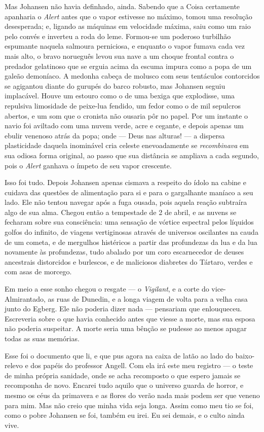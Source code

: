 Mas Johansen não havia definhado, ainda. Sabendo que a Coisa certamente
apanharia o \emph{Alert} antes que o vapor estivesse no máximo, tomou
uma resolução desesperada; e, ligando as máquinas em velocidade máxima,
saiu como um raio pelo convés e inverteu a roda do leme. Formou-se um
poderoso turbilhão espumante naquela salmoura perniciosa, e enquanto o
vapor fumava cada vez mais alto, o bravo norueguês levou sua nave a um
choque frontal contra o predador gelatinoso que se erguia acima da
escuma impura como a popa de um galeão demoníaco. A medonha cabeça de
molusco com seus tentáculos contorcidos se agigantou diante do gurupés
do barco robusto, mas Johansen seguiu implacável. Houve um estouro como
o de uma bexiga que explodisse, uma repulsiva limosidade de peixe-lua
fendido, um fedor como o de mil sepulcros abertos, e um som que o
cronista não ousaria pôr no papel. Por um instante o navio foi aviltado
com uma nuvem verde, acre e cegante, e depois apenas um ebulir venenoso
atrás da popa; onde --- Deus nas alturas! --- a dispersa plasticidade
daquela inominável cria celeste enevoadamente se \emph{recombinava} em
sua odiosa forma original, ao passo que sua distância se ampliava a cada
segundo, pois o \emph{Alert} ganhava o ímpeto de seu vapor crescente.

Isso foi tudo. Depois Johansen apenas cismava a respeito do ídolo na
cabine e cuidava das questões de alimentação para si e para o
gargalhante maníaco a seu lado. Ele não tentou navegar após a fuga
ousada, pois aquela reação subtraíra algo de sua alma. Chegou então a
tempestade de 2 de abril, e as nuvens se fecharam sobre sua consciência:
uma sensação de vórtice espectral pelos líquidos golfos do infinito, de
viagens vertiginosas através de universos oscilantes na cauda de um
cometa, e de mergulhos histéricos a partir das profundezas da lua e da
lua novamente às profundezas, tudo abalado por um coro escarnecedor de
deuses ancestrais distorcidos e burlescos, e de maliciosos diabretes do
Tártaro, verdes e com asas de morcego.

Em meio a esse sonho chegou o resgate
--- o \emph{Vigilant}, e a corte
do vice-Almirantado, as ruas de Dunedin, e a longa viagem de volta para
a velha casa junto do Egberg. Ele não poderia dizer nada --- pensariam
que enlouqueceu. Escreveria sobre o que havia conhecido antes que viesse
a morte, mas sua esposa não poderia suspeitar. A morte seria uma bênção
se pudesse ao menos apagar todas as suas memórias.

Esse foi o documento que li, e que pus agora na caixa de latão ao lado
do baixo-relevo e dos papéis do professor Angell. Com ela irá este meu
registro --- o teste de minha própria sanidade, onde se acha recomposto
o que espero jamais se recomponha de novo. Encarei tudo aquilo que o
universo guarda de horror, e mesmo os céus da primavera e as flores do
verão nada mais podem ser que veneno para mim. Mas não creio que minha
vida seja longa. Assim como meu tio se foi, como o pobre Johansen se
foi, também eu irei. Eu sei demais, e o culto ainda vive.

